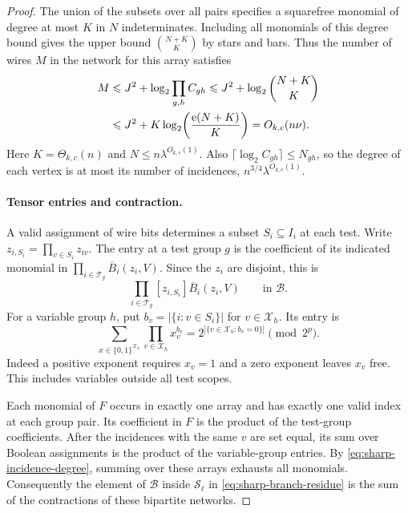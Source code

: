 \begin{proof}
The union of the subsets over all pairs specifies a squarefree
monomial of degree at most $K$ in $N$ indeterminates. Including
all monomials of this degree bound gives the upper bound
$\binom{N+K}{K}$ by stars and bars. Thus the number
of wires $M$ in the network for this array satisfies
\begin{align}
 M &\le J^2+\log_2\prod_{g,h} C_{gh}
      \le J^2+\log_2\binom{N+K}{K} \notag\\
   &\le J^2+K\log_2\!\left(\frac{\mathrm e(N+K)}{K}\right)
      = O_{k,c}(n\nu).
 \label{eq:sharp-wire-budget}
\end{align}
Here $K=\Theta_{k,c}(n)$ and $N\le n\lambda^{O_{k,c}(1)}$.
Also $\lceil\log_2 C_{gh}\rceil\le N_{gh}$, so the degree of each
vertex is at most its number of incidences,
$n^{3/4}\lambda^{O_{k,c}(1)}$.

\paragraph{Tensor entries and contraction.}
A valid assignment of wire bits determines a subset $S_i\subseteq I_i$
at each test. Write $z_{i,S_i}=\prod_{v\in S_i}z_{iv}$. The entry
at a test group $g$ is the coefficient of its indicated monomial
in $\prod_{i\in\mathcal T_g}\overline B_i(z_i,V)$. Since the $z_i$
are disjoint, this is
\[
 \prod_{i\in\mathcal T_g}[z_{i,S_i}]\overline B_i(z_i,V)
 \qquad\text{in }\mathcal B.
\]
For a variable group $h$, put $b_v=|\{i:v\in S_i\}|$
for $v\in\mathcal X_h$. Its entry is
\[
 \sum_{x\in\{0,1\}^{\mathcal X_h}}
        \prod_{v\in\mathcal X_h}x_v^{b_v}
   =2^{|\{v\in\mathcal X_h:b_v=0\}|}\pmod{2^p}.
\]
Indeed a positive exponent requires $x_v=1$ and a zero exponent
leaves $x_v$ free. This includes variables outside all test scopes.

Each monomial of $F$ occurs in exactly one array and has exactly
one valid index at each group pair. Its coefficient in $F$ is the
product of the test-group coefficients. After the incidences with
the same $v$ are set equal, its sum over Boolean assignments is
the product of the variable-group entries. By
\eqref{eq:sharp-incidence-degree}, summing over these arrays exhausts
all monomials. Consequently the element of $\mathcal B$ inside
$\mathcal S_\ell$ in \eqref{eq:sharp-branch-residue} is the sum of
the contractions of these bipartite networks.


\end{proof}
